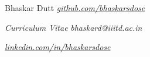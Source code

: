 \documentclass[10pt]{report}
\begin{document}
	
\Huge\item Bhaskar Dutt
\hfill\small\faGithub\hspace{1pt} \href{https://github.com/bhaskarsdose}{\color{gray}\textit{github.com/bhaskarsdose}}
\item\textit{\large\color{Gray}Curriculum Vitae}
\hfill\faAt\hspace{1pt}\textit{\color{gray} bhaskard@iiitd.ac.in}\vspace{1pt}

\hfill\faLinkedin\hspace{1pt} \href{https://www.linkedin.com/in/bhaskarsdose}{\color{gray}\textit{linkedin.com/in/bhaskarsdose}}\vspace{1pt}
\end{document}
